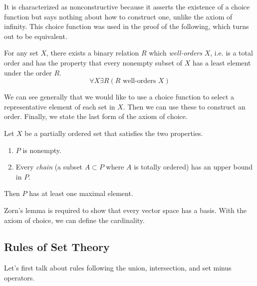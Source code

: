 \documentclass{article}
\begin{document}
    It is characterized as nonconstructive because it asserts the existence of a choice function but says nothing about how to construct one, unlike the axiom of infinity. This choice function was used in the proof of the following, which turns out to be equivalent.  

    \begin{axiom}
      For any set $X$, there exists a binary relation $R$ which \textit{well-orders} $X$, i.e. is a total order and has the property that every nonempty subset of $X$ has a least element under the order $R$. 
      \begin{equation}
        \forall X \exists R (R \text{ well-orders } X)
      \end{equation}
    \end{axiom}

    We can see generally that we would like to use a choice function to select a representative element of each set in $X$. Then we can use these to construct an order. Finally, we state the last form of the axiom of choice. 

    \begin{axiom}
      Let $X$ be a partially ordered set that satisfies the two properties. 
      \begin{enumerate}
        \item $P$ is nonempty. 
        \item Every \textit{chain} (a subset $A \subset P$ where $A$ is totally ordered) has an upper bound in $P$. 
      \end{enumerate}
      Then $P$ has at least one maximal element. 
    \end{axiom}

    Zorn's lemma is required to show that every vector space has a basis. With the axiom of choice, we can define the cardinality. 

    \begin{definition}[Cardinality]
      
    \end{definition}

  \subsection{Rules of Set Theory} 

    Let's first talk about rules following the union, intersection, and set minus operators. 
\end{document}
